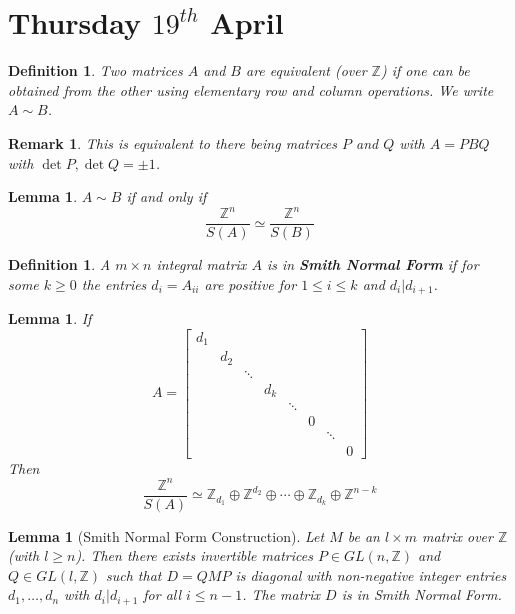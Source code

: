 \documentclass[a4paper,10pt]{article}
\newcommand{\ZZ}{\mathbb{Z}}
\newtheorem{Def}[thm]{Definition}
\newtheorem{Lem}[thm]{Lemma}
\newtheorem{rem}[thm]{Remark}
\begin{document}
\section{Thursday $19^{th}$ April}

\begin{Def}
Two matrices $A$ and $B$ are equivalent (over $\ZZ$) if one can be obtained from the other using elementary row and column operations.  We write $A \sim B$. 
\end{Def}

\begin{rem}
This is equivalent to there being matrices $P$ and $Q$ with $A = PBQ$ with $\det P, \det Q = \pm 1$. 
\end{rem}

\begin{Lem}
$A \sim B$ if and only if 
\[ \frac{\ZZ^n}{S(A)} \simeq \frac{\ZZ^n}{S(B)} \]
\end{Lem}

\begin{Def}
A $m\times n$ integral matrix $A$ is in \textbf{Smith Normal Form} if for some $k \geq 0$ the entries $d_i = A_{ii}$ are positive for $1 \leq i \leq k$ and $d_i | d_{i+1}$. 
\end{Def}

\begin{Lem}
If 
\[A = \begin{bmatrix} d_1 \\
                        & d_2 \\
                        & &\ddots \\
                        & &       & d_k \\
                        & & &          & \ddots \\
                        & & & &             & 0 \\
                        & & & & &                & \ddots \\
                        & & & & & &                   & 0
 \end{bmatrix} \]
Then 
\[ \frac{\ZZ^n}{S(A)} \simeq \ZZ_{d_1} \oplus \ZZ^{d_2} \oplus \cdots \oplus \ZZ_{d_k} \oplus \ZZ^{n - k} \]
\end{Lem}

\begin{Lem}[Smith Normal Form Construction]
Let $M$ be an $l \times m$ matrix over $\ZZ$ (with $l \geq n$). Then there exists invertible matrices $P \in GL(n,\ZZ)$ and $Q \in GL(l,\ZZ)$ such that $D = QMP$ is diagonal with non-negative integer entries $d_1, \dots, d_n$ with $d_i | d_{i+1}$ for all $i \leq n-1$. The matrix $D$ is in Smith Normal Form.
\end{Lem}
\end{document}

